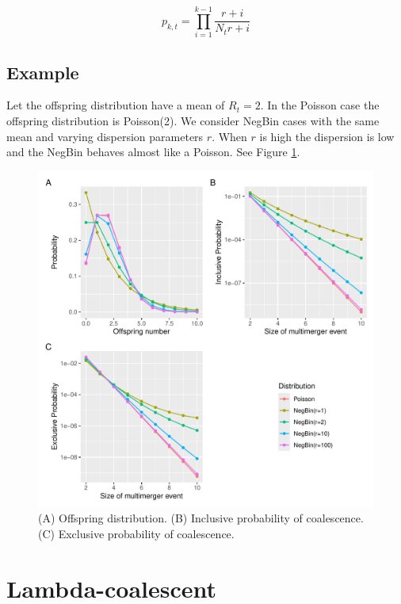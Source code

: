 \documentclass{article}
\begin{document}
\begin{equation}
p_{k,t}=\prod_{i=1}^{k-1}\frac{r+i}{N_t r+i}
\end{equation}

\subsection{Example}

Let the offspring distribution have a mean of $R_t=2$. In the Poisson case the offspring distribution is Poisson(2). We consider NegBin cases with the same mean and varying dispersion parameters $r$. When $r$ is high the dispersion is low and the NegBin behaves almost like a Poisson.
See Figure \ref{fig:probs}.

\begin{figure}[t!]
\begin{center}
\includegraphics[width=15cm]{../run/figure.pdf}
\end{center}
\caption{(A) Offspring distribution. (B) Inclusive probability of coalescence. (C) Exclusive probability of coalescence.
\label{fig:probs}}
\end{figure}

\section{Lambda-coalescent}
\end{document}
